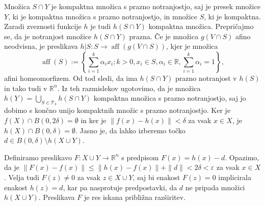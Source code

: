 \documentclass[mat1]{fmfdelo}
\newcommand{\R}{\mathbb R}
\DeclareMathOperator{\aff}{aff}
\newcommand{\0}{0}
\newcommand{\pT}{\mathcal T}
\begin{document}
\begin{dokaz}
Množica $S \cap Y$ je kompaktna množica s prazno notranjostjo, saj je presek množice $Y$, ki je kompaktna množica s prazno notranjostjo, in množice $S$, ki je kompaktna. Zaradi zveznosti funkcije $h$ je tudi $h(S \cap Y)$ kompaktna množica. Prepričajmo se, da je notranjost množice $h(S \cap Y)$ prazna. Če je množica $g(V \cap S)$ afino neodvisna, je preslikava $h|S : S \to \aff(g(V \cap S))$, kjer je množica 
$$\aff(S) := \left\{ \sum_{i=1}^k \alpha_i x_i ; k>0, x_i \in S, \alpha_i \in \R, \sum_{i=1}^k \alpha_i= 1 \right\},$$
afini homeomorfizem. Od tod sledi, da ima $h(S \cap Y)$ prazno notranjost v $h(S)$ in tako tudi v $\R^n$. Iz teh razmislekov ugotovimo, da je množica $h(Y) = \bigcup\limits_{S \in \pT_k} h(S \cap Y)$ kompaktna množica s prazno notranjostjo, saj jo dobimo s končno unijo kompaktnih množic s prazno notranjostjo. Ker je $f(X) \cap B(\0, 2 \delta) = \emptyset$ in ker je $\| f(x) - h(x) \| < \delta$ za vsak $x \in X$, je $h(X) \cap B(\0, \delta) = \emptyset$. Jasno je, da lahko izberemo točko $d \in B(\0, \delta) \setminus h(X \cup Y)$.

Definiramo preslikavo $F : X \cup Y \to \R^n$ s predpisom $F(x)  = h(x) - d$. Opazimo, da je $\| F(x) - f(x) \| \leq \| h(x) - f(x) \| + \| d \| < 2\delta < \varepsilon$ za vsak $x \in X$. Velja tudi $F(z) \neq \0$ za vsak $z \in X \cup Y$, saj bi enakost $F(z) = \0$ implicirala enakost $h(z) = d$, kar pa nasprotuje predpostavki, da $d$ ne pripada množici $h(X \cup Y)$. Preslikava $F$ je res iskana približna razširitev.
\end{dokaz}

\end{document}
